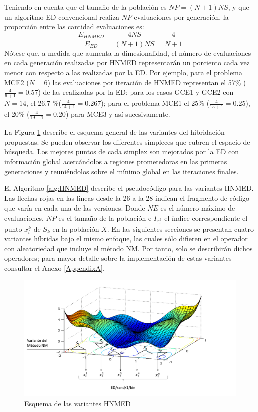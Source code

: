 Teniendo en cuenta que el tamaño de la población es $NP=(N+1)NS$, y que un algoritmo ED convencional realiza $NP$ evaluaciones por generación, la proporción entre las cantidad evaluaciones es:
\begin{equation}\label{eq:relación de evaluaciones}
\frac{E_{HNMED}}{E_{ED}}=\frac{4NS}{(N+1)NS}=\frac{4}{N+1}
\end{equation}
Nótese que, a medida que aumenta la dimesionalidad, el número de evaluaciones en cada generación realizadas por HNMED representarán un porciento cada vez menor con respecto a las realizadas por la ED. Por ejemplo, para el problema MCE2 ($N=6$) las evaluaciones por iteración de HNMED representan el 57\% ($\frac{4}{6+1}=0.57$) de las realizadas por la ED; para los casos GCE1 y GCE2 con $N=14$, el 26.7 \%($\frac{4}{14+1}=0.267$); para el problema MCE1 el 25\% ($\frac{4}{15+1}=0.25$), el 20\% ($\frac{4}{19+1}=0.20$) para MCE3 y así sucesivamente.

La Figura \ref{fig:HNMED} describe el esquema general de las variantes del  hibridación propuestas. Se pueden observar los diferentes símpleces  que cubren el espacio de búsqueda. Los mejores puntos de cada simplex son mejorados por la ED con información global acercándolos a regiones prometedoras en las primeras generaciones y reuniéndolos sobre el mínimo global en las iteraciones finales.

El Algoritmo \ref{alg:HNMED} describe el pseudocódigo para las variantes HNMED. Las flechas rojas en las lineas desde la 26 a la 28 indican el fragmento de código que varía en cada una de las versiones. Donde $NE$ es el número máximo de evaluaciones, $NP$ es el tamaño de la población e $I_{x_l^k}$ el índice correspondiente el punto $x_l^k$ de $S_k$ en la población $X$. En las siguientes secciones se presentan cuatro variantes híbridas bajo el mismo enfoque, las cuales sólo difieren en el operador con aleatoriedad que incluye el método NM. Por tanto, solo se describirán dichos operadores; para mayor detalle sobre la implementación de estas variantes consultar el Anexo \ref{AppendixA}. 
\begin{center}
\begin{figure}
\includegraphics[width=\textwidth]{Figures/Esquema}
\caption{Esquema de las variantes HNMED}
\label{fig:HNMED}
\end{figure}
\end{center}

